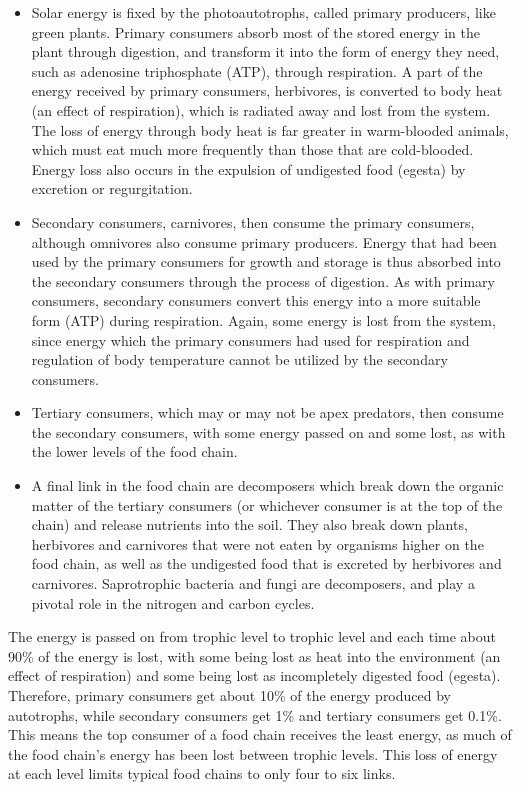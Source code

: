 \begin{itemize}
\tightlist
\item
  Solar energy is fixed by the photoautotrophs, called primary producers, like green plants. Primary consumers absorb most of the stored energy in the plant through digestion, and transform it into the form of energy they need, such as adenosine triphosphate (ATP), through respiration. A part of the energy received by primary consumers, herbivores, is converted to body heat (an effect of respiration), which is radiated away and lost from the system. The loss of energy through body heat is far greater in warm-blooded animals, which must eat much more frequently than those that are cold-blooded. Energy loss also occurs in the expulsion of undigested food (egesta) by excretion or regurgitation.
\item
  Secondary consumers, carnivores, then consume the primary consumers, although omnivores also consume primary producers. Energy that had been used by the primary consumers for growth and storage is thus absorbed into the secondary consumers through the process of digestion. As with primary consumers, secondary consumers convert this energy into a more suitable form (ATP) during respiration. Again, some energy is lost from the system, since energy which the primary consumers had used for respiration and regulation of body temperature cannot be utilized by the secondary consumers.
\item
  Tertiary consumers, which may or may not be apex predators, then consume the secondary consumers, with some energy passed on and some lost, as with the lower levels of the food chain.
\item
  A final link in the food chain are decomposers which break down the organic matter of the tertiary consumers (or whichever consumer is at the top of the chain) and release nutrients into the soil. They also break down plants, herbivores and carnivores that were not eaten by organisms higher on the food chain, as well as the undigested food that is excreted by herbivores and carnivores. Saprotrophic bacteria and fungi are decomposers, and play a pivotal role in the nitrogen and carbon cycles.
\end{itemize}

The energy is passed on from trophic level to trophic level and each time about 90\% of the energy is lost, with some being lost as heat into the environment (an effect of respiration) and some being lost as incompletely digested food (egesta). Therefore, primary consumers get about 10\% of the energy produced by autotrophs, while secondary consumers get 1\% and tertiary consumers get 0.1\%. This means the top consumer of a food chain receives the least energy, as much of the food chain's energy has been lost between trophic levels. This loss of energy at each level limits typical food chains to only four to six links.

